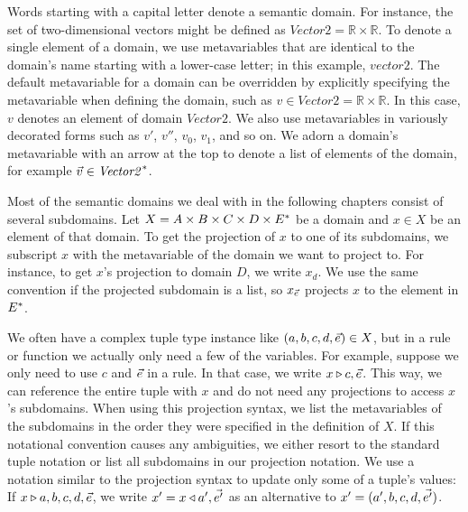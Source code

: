 \documentclass{article}
\begin{document}
	Words starting with a capital letter denote a semantic domain. For instance, the set of two-dimensional vectors might be defined as 
	$\mathit{Vector2} = \mathbb{R} \times \mathbb{R}$. To denote a single element of a domain, we use metavariables that are identical to the domain's
	name starting with a lower-case letter; in this example, $\mathit{vector2}$. 
	The default metavariable for a domain can be overridden by explicitly specifying the metavariable 
	when defining the domain, such as $v \in \mathit{Vector2} = \mathbb{R} \times \mathbb{R}$. In this case, $v$ denotes an element of domain $\mathit{Vector2}$.
	We also use metavariables in variously decorated forms such as $v'$, $v''$, $v_0$, $v_1$, and so on. 
	We adorn a domain's metavariable with an arrow at the top to denote a list of elements of the domain, for example
	$\vec{v} \in \mathit{Vector2}^*$.
 
	Most of the semantic domains we deal with in the following chapters consist of several subdomains. 
	Let $X = A \times B \times C \times D \times E^*$ be a domain and $x \in X$ be
	an element of that domain. To get the projection of $x$ to one of its subdomains, we subscript $x$ with the metavariable of the
	domain we want to project to. For instance, to get $x$'s projection to domain $D$, we write $x_d$. We use the same convention if the projected subdomain is
	a list, so $x_{\vec{e}}$ projects $x$ to the element in $E^*$.
	
	We often have a complex tuple type instance like $(a, b, c, d, \vec{e}) \in X$, but in a rule or
	function we actually only need a few of the variables. For example, suppose we only need to use $c$ and $\vec{e}$ in a rule. In that case,
	we write $x \triangleright c, \vec{e}$.
	This way, we can reference the entire tuple with $x$ and do not need any projections to access $x$'s subdomains. When using this projection syntax, we list the
	metavariables of the subdomains in the order they were specified in the definition of $X$. If this notational convention causes any ambiguities, we either
	resort to the standard tuple notation or list all subdomains in our projection notation. We use a notation similar to the
	projection syntax to update only some of a tuple's values: If $x \triangleright a, b, c, d, \vec{e}$, we write $x' = x
	\triangleleft a', \vec{e'}$ as an alternative to $x' = (a', b, c, d, \vec{e'})$.  
\end{document}
